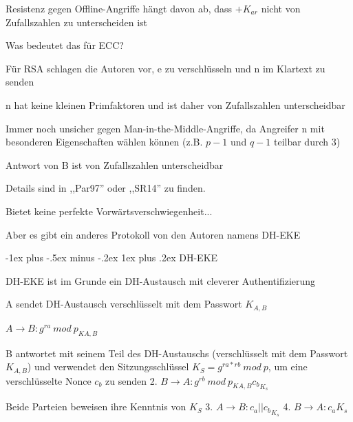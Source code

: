 \documentclass[a4paper]{article}
\makeatletter
\renewcommand{\subsubsection}{\@startsection{subsubsection}{3}{0mm}%
 {-1ex plus -.5ex minus -.2ex}%
 {1ex plus .2ex}%
 {\normalfont\small\bfseries}}
\makeatother
\begin{document}
\begin{multicols}{3}
      \begin{itemize*}
            \item Resistenz gegen Offline-Angriffe hängt davon ab, dass $+K_{ar}$
            nicht von Zufallszahlen zu unterscheiden ist
            \begin{itemize*}
                  \item Was bedeutet das für ECC?
                  \item Für RSA schlagen die Autoren vor, e zu verschlüsseln und n im Klartext zu senden
                  \begin{itemize*} \item n hat keine kleinen Primfaktoren und ist daher von Zufallszahlen unterscheidbar \item Immer noch unsicher gegen Man-in-the-Middle-Angriffe, da Angreifer n mit besonderen Eigenschaften wählen können (z.B. $p-1$ und $q-1$ teilbar durch 3) \item Antwort von B ist von Zufallszahlen unterscheidbar \item Details sind in ,,Par97'' oder ,,SR14'' zu finden. \end{itemize*}
            \end{itemize*}
            \item Bietet keine perfekte Vorwärtsverschwiegenheit...
            \item Aber es gibt ein anderes Protokoll von den Autoren namens DH-EKE
      \end{itemize*}


      \subsubsection{DH-EKE}

      \begin{itemize*}
            \item DH-EKE ist im Grunde ein DH-Austausch mit cleverer Authentifizierung
            \item A sendet DH-Austausch verschlüsselt mit dem Passwort $K_{A,B}$
            \begin{enumerate*}
                  \def\labelenumi{\arabic{enumi}.}
                  \item $A\rightarrow B:{g^{ra}\ mod\ p}_{{K}{A,B}}$
            \end{enumerate*}
            \item B antwortet mit seinem Teil des DH-Austauschs (verschlüsselt mit dem
            Passwort $K_{A,B}$) und verwendet den Sitzungsschlüssel
            $K_S=g^{ra*rb}\ mod\ p$, um eine
            verschlüsselte Nonce $c_b$ zu senden
            2. $B\rightarrow A:{g^{rb}\ mod\ p}_{{K}{A,B}}{c_b}_{K_s}$
            \item Beide Parteien beweisen ihre Kenntnis von $K_S$
            3. $A\rightarrow B:{c_a|| c_b}_{K_s}$
            4. $B\rightarrow A:{c_a}{K_s}$
      \end{itemize*}


\end{multicols}
\end{document}
